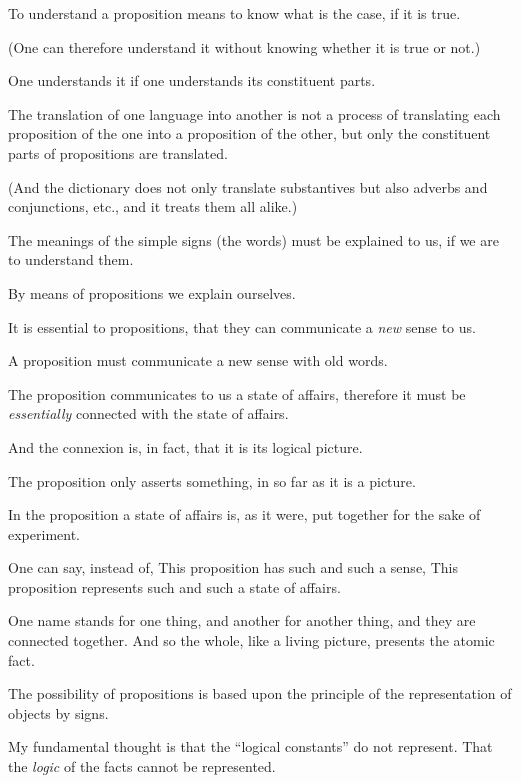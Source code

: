 {To understand a proposition means to know
what is the case, if it is true.

(One can therefore understand it without
knowing whether it is true or not.)

One understands it if one understands its
constituent parts.}


{The translation of one language into another
is not a process of translating each proposition
of the one into a proposition of the other, but
only the constituent parts of propositions are
translated.

(And the dictionary does not only translate
substantives but also adverbs and conjunctions,
etc., and it treats them all alike.)}


{The meanings of the simple signs (the words)
must be explained to us, if we are to understand
them.

By means of propositions we explain ourselves.}


{It is essential to propositions, that they can
communicate a \emph{new} sense to us.}


{A proposition must communicate a new sense
with old words.

The proposition communicates to us a state of
affairs, therefore it must be \emph{essentially} connected
with the state of affairs.

And the connexion is, in fact, that it is its
logical picture.

The proposition only asserts something, in so
far as it is a picture.}


{In the proposition a state of affairs is, as it
were, put together for the sake of experiment.

One can say, instead of, This proposition has
such and such a sense, This proposition represents
such and such a state of affairs.}


{One name stands for one thing, and another
for another thing, and they are connected together.
And so the whole, like a living picture, presents
the atomic fact.}


{The possibility of propositions is based upon the
principle of the representation of objects by signs.

My fundamental thought is that the ``logical
constants'' do not represent. That the \emph{logic} of the
facts cannot be represented.}


